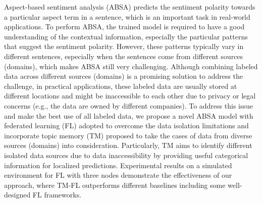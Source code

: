 Aspect-based sentiment analysis (ABSA) predicts the sentiment polarity towards a particular aspect term in a sentence, which is an important task in real-world applications. To perform ABSA, the trained model is required to have a good understanding of the contextual information, especially the particular patterns that suggest the sentiment polarity. However, these patterns typically vary in different sentences, especially when the sentences come from different sources (domains), which makes ABSA still very challenging. Although combining labeled data across different sources (domains) is a promising solution to address the challenge, in practical applications, these labeled data are usually stored at different locations and might be inaccessible to each other due to privacy or legal concerns (e.g., the data are owned by different companies). To address this issue and make the best use of all labeled data, we propose a novel ABSA model with federated learning (FL) adopted to overcome the data isolation limitations and incorporate topic memory (TM) proposed to take the cases of data from diverse sources (domains) into consideration. Particularly, TM aims to identify different isolated data sources due to data inaccessibility by providing useful categorical information for localized predictions. Experimental results on a simulated environment for FL with three nodes demonstrate the effectiveness of our approach, where TM-FL outperforms different baselines including some well-designed FL frameworks.
